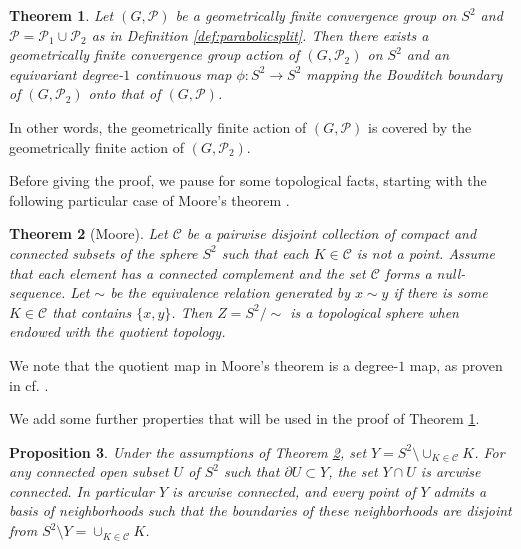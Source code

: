 \documentclass[11pt]{article}
\newtheorem{theorem}{Theorem}[section]
\newtheorem{proposition}[theorem]{Proposition}
\theoremstyle{definition}
\newcommand\CCC{\mathcal{C}}
\newcommand\PP{\mathcal{P}}
\begin{document}
\begin{theorem}\label{thm:blowup} Let $(G,\PP)$ be a geometrically finite convergence group on $S^2$
and
$\PP=\PP_1\cup \PP_2$ as in Definition \ref{def:parabolicsplit}.  Then there exists a geometrically finite convergence group action of $(G,\PP_2)$ on $S^2$
 and an equivariant degree-$1$ continuous map
$\phi:S^2\to S^2$ mapping the Bowditch boundary of $(G,\PP_2)$ onto that of $(G,\PP)$.
\end{theorem}

In other words, the geometrically finite action of $(G,\PP)$ is covered by the geometrically finite action of $(G,\PP_2)$.

Before giving the proof, we pause for some topological facts, starting with the following particular case  of Moore's theorem \cite{moore}.  

\begin{theorem}[Moore]\label{thm:moore} Let $\CCC$ be a pairwise disjoint collection of  compact and connected subsets of the sphere $S^2$ such that each $K \in \CCC$ is not a point.  Assume that each element has a connected complement
and the set $\CCC$ forms a null-sequence. Let $\sim$ be the equivalence relation generated by $x\sim y$ if there is some $K\in\CCC$ that contains $\{x,y\}$. Then
$Z=S^2/\sim$ is a topological sphere when endowed with the quotient topology. \end{theorem}

We note that the quotient map in Moore's theorem is a degree-$1$ map, as proven in cf. \cite[Theorems 13.4, 25.1]{daverman:decompositions}.

\medskip

We add some further properties that will be used in the proof of Theorem \ref{thm:blowup}.

\begin{proposition}\label{prop:Y}    Under the assumptions of Theorem \ref{thm:moore}, set $Y=S^2\setminus \cup_{K\in\CCC} K$.
For any connected open subset $U$ of $S^2$ such that $\partial U\subset Y$, the set $Y\cap U$ is arcwise connected. In particular
$Y$ 
 is arcwise connected, and every point of $Y$ admits a  basis of neighborhoods such that the boundaries of these neighborhoods are disjoint
from $S^2 \setminus Y = \cup_{K\in\CCC} K $.  \end{proposition}
\end{document}
